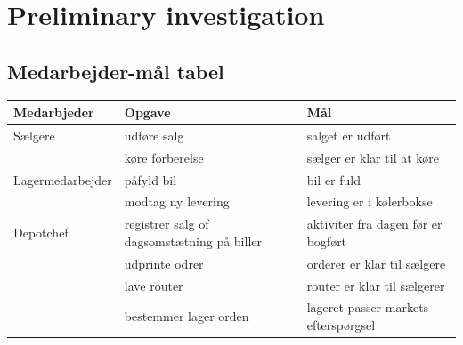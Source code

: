 \section{Preliminary investigation}\label{sec:preinvestigation}

\subsection{Medarbejder-mål tabel}\label{mmt}
\begin{center}
\begin{tabular}{ |p{100pt}|p{100pt}|p{100pt}| }
    \hline
    Medarbjeder & Opgave & Mål \\
    \hline\hline
    Sælgere
    & udføre salg & salget er udført \\
    \hline
    & køre forberelse & sælger er klar til at køre \\
    \hline
    Lagermedarbejder
    & påfyld bil & bil er fuld \\
    \hline
    & modtag ny levering & levering er i kølerbokse \\
    \hline
    Depotchef
    & registrer salg of dagsomstætning på biller & aktiviter fra dagen før er bogført \\
    \hline
    & udprinte odrer & orderer er klar til sælgere \\
    \hline
    & lave router & router er klar til sælgerer \\
    \hline
    & bestemmer lager orden & lageret passer markets efterspørgsel \\
    \hline
\end{tabular}
\end{center}

